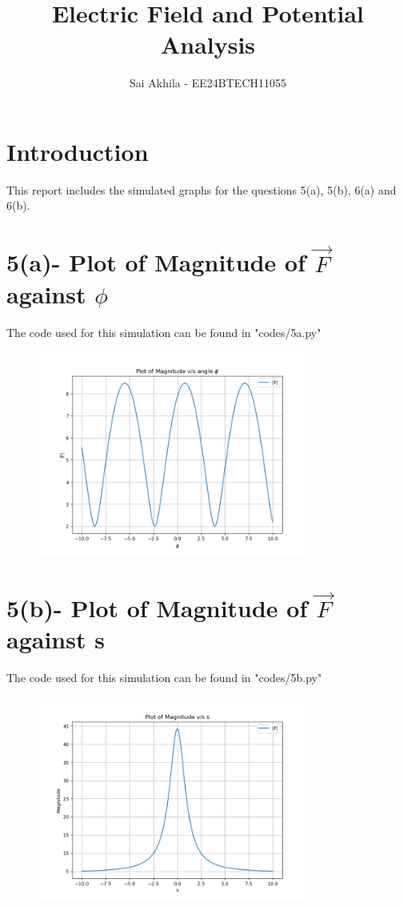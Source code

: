 \documentclass{article}
\title{Electric Field and Potential Analysis}
\author{Sai Akhila - EE24BTECH11055}
\date{}
\begin{document}
\maketitle

\section{Introduction}
This report includes the simulated graphs for the questions 5(a), 5(b), 6(a) and 6(b). 

\section{5(a)- Plot of Magnitude of $\vec{F}$ against $\phi$}
The code used for this simulation can be found in "codes/5a.py"
\begin{figure}[H]
    \centering
    \includegraphics[width=0.8\textwidth]{figs/5a.png}
    \label{fig:|F|}
\end{figure}

\section{5(b)- Plot of Magnitude of $\vec{F}$ against s}
The code used for this simulation can be found in "codes/5b.py"
\begin{figure}[H]
    \centering
    \includegraphics[width=0.8\textwidth]{figs/5b.png}
    \label{fig:|F|}
\end{figure}
\end{document}
